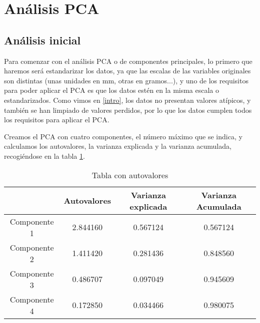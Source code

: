 \documentclass[a4paper,onecolumn]{extarticle}
\let\stdsection\section
\renewcommand\section{\newpage\stdsection}
\begin{document}
\begin{sloppypar}
\section{Análisis PCA} \label{analisisPCA}
\subsection{Análisis inicial} \label{PCAinicial}
Para comenzar con el análisis PCA o de componentes principales, lo primero que haremos será estandarizar los datos, ya que las escalas de las variables originales 
son distintas (unas unidades en mm, otras en gramos...), y uno de los requisitos para poder aplicar el PCA es que los datos estén en la misma escala o 
estandarizados. Como vimos en \ref{intro}, los datos no presentan valores atípicos, y también se han limpiado de valores perdidos, por lo que los datos cumplen 
todos los requisitos para aplicar el PCA.

Creamos el PCA con cuatro componentes, el número máximo que se indica, y calculamos los autovalores, la varianza explicada y la varianza acumulada, recogiéndose 
en la tabla \ref{tab:autovalores}.
\begin{table}[h!]
    \centering
    \begin{tabular}{|c|c|c|c|}
        \hline
        & \textbf{Autovalores} & \textbf{Varianza explicada} & \textbf{Varianza Acumulada} \\
        \hline
        Componente 1 & 2.844160 & 0.567124 & 0.567124 \\
        Componente 2 & 1.411420 & 0.281436 & 0.848560 \\
        Componente 3 & 0.486707 & 0.097049 & 0.945609 \\
        Componente 4 & 0.172850 & 0.034466 & 0.980075 \\
        \hline
    \end{tabular} 
    \caption{Tabla con autovalores}
    \label{tab:autovalores}
\end{table}


\end{sloppypar}
\end{document}
